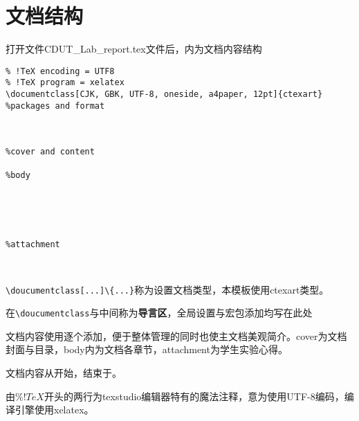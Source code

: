 \section{文档结构}
打开文件CDUT\_Lab\_report.tex文件后，内为文档内容结构
\begin{verbatim}
% !TeX encoding = UTF8
% !TeX program = xelatex
\documentclass[CJK, GBK, UTF-8, oneside, a4paper, 12pt]{ctexart}
%packages and format



%cover and content

%body





%attachment



\end{verbatim}

\verb|\doucumentclass[...]\{...}|称为设置文档类型，本模板使用ctexart类型。

在\verb|\doucumentclass|与\verb||中间称为\textbf{导言区}，全局设置与宏包添加均写在此处

文档内容使用\verb||逐个添加，便于整体管理的同时也使主文档美观简介。cover为文档封面与目录，body内为文档各章节，attachment为学生实验心得。

文档内容从\verb||开始，结束于\verb||。

由$\% !TeX$开头的两行为texstudio编辑器特有的魔法注释，意为使用UTF-8编码，编译引擎使用xelatex。